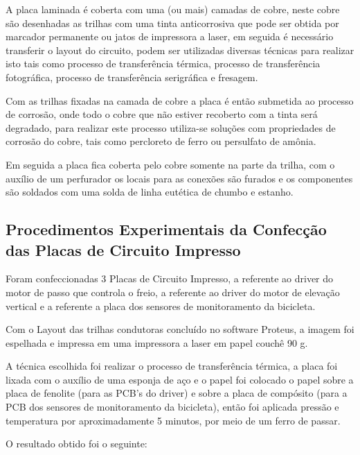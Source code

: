 A placa laminada é coberta com uma (ou mais) camadas de cobre, neste cobre são desenhadas as trilhas com uma tinta anticorrosiva que pode ser obtida por marcador permanente ou jatos de impressora a laser, em seguida é necessário transferir o layout do circuito, podem ser utilizadas diversas técnicas para realizar isto tais como processo de transferência térmica, processo de transferência fotográfica, processo de transferência serigráfica e fresagem. 

Com as trilhas fixadas na camada de cobre a placa é então submetida ao processo de corrosão, onde todo o cobre que não estiver recoberto com a tinta será degradado, para realizar este processo utiliza-se soluções com propriedades de corrosão do cobre, tais como percloreto de ferro ou persulfato de amônia.   

Em seguida a placa fica coberta pelo cobre somente na parte da trilha, com o auxílio de um perfurador os locais para as conexões são furados e os componentes são soldados com uma solda de linha eutética de chumbo e estanho. 

\subsection{Procedimentos Experimentais da Confecção das Placas de Circuito Impresso}

Foram confeccionadas 3 Placas de Circuito Impresso, a referente ao driver do motor de passo que controla o freio, a referente ao driver do motor de elevação vertical e a referente a placa dos sensores de monitoramento da bicicleta. 

Com o Layout das trilhas condutoras concluído no software Proteus, a imagem foi espelhada e impressa em uma impressora a laser em papel couchê 90 g. 

A técnica escolhida foi realizar o processo de transferência térmica, a placa foi lixada com o auxílio de uma esponja de aço e o papel foi colocado o papel sobre a placa de fenolite (para as PCB’s do driver) e sobre a placa de compósito (para a PCB dos sensores de monitoramento da bicicleta), então foi aplicada pressão e temperatura por aproximadamente 5 minutos, por meio de um ferro de passar.

O resultado obtido foi o seguinte: 

